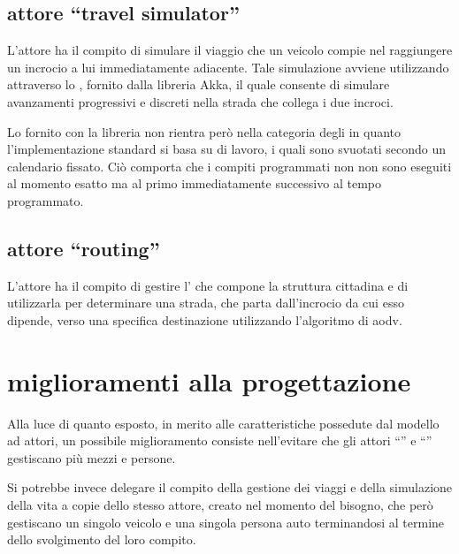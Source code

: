 \subsection*{attore ``travel simulator''}
\label{soluzione-proposta-architettura-travel-simulator}
L'attore ha il compito di simulare il viaggio che un veicolo compie nel raggiungere un incrocio a lui immediatamente adiacente. Tale simulazione avviene utilizzando attraverso lo , fornito dalla libreria Akka, il quale consente di simulare avanzamenti progressivi e discreti nella strada che collega i due incroci.

Lo  fornito con la libreria non rientra però nella categoria degli  in quanto l'implementazione standard si basa su  di lavoro, i quali sono svuotati secondo un calendario fissato. Ciò comporta che i compiti programmati non non sono eseguiti al momento esatto ma al primo  immediatamente successivo al tempo programmato.

\subsection*{attore ``routing''}
\label{soluzione-proposta-architettura-routing}
L'attore ha il compito di gestire l' che compone la struttura cittadina e di utilizzarla per determinare una strada, che parta dall'incrocio da cui esso dipende, verso una specifica destinazione utilizzando l'algoritmo di  \ac{aodv}.

\section*{miglioramenti alla progettazione}
\label{soluzione-proposta-miglioramenti-alla-progettazione}
Alla luce di quanto esposto, in merito alle caratteristiche possedute dal modello ad attori, un possibile miglioramento consiste nell'evitare che gli attori ``'' e ``'' gestiscano più mezzi e persone.

Si potrebbe invece delegare il compito della gestione dei viaggi e della simulazione della vita a copie dello stesso attore, creato nel momento del bisogno, che però gestiscano un singolo veicolo e una singola persona auto terminandosi al termine dello svolgimento del loro compito.

